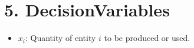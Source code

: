 \documentclass[a4paper,12pt]{article}
\begin{document}
\section{5. DecisionVariables}
\begin{itemize}
    \item $x_i$: Quantity of entity $i$ to be produced or used.
    
\end{itemize}

\end{document}
